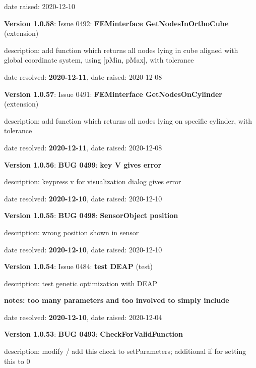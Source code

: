 date raised: 2020-12-10   \ei
  \item {\bf Version 1.0.58}: \vspace{-6pt} 
  Issue 0492: {\bf FEMinterface GetNodesInOrthoCube}
(extension)
  \bi
  \item {\small description: add function which returns all nodes lying in cube aligned with global coordinate system, using [pMin, pMax], with tolerance}
  \item   date resolved: {\bf 2020-12-11},
date raised: 2020-12-08   \ei
  \item {\bf Version 1.0.57}: \vspace{-6pt} 
  Issue 0491: {\bf FEMinterface GetNodesOnCylinder}
(extension)
  \bi
  \item {\small description: add function which returns all nodes lying on specific cylinder, with tolerance}
  \item   date resolved: {\bf 2020-12-11},
date raised: 2020-12-08   \ei
  \item {\bf Version 1.0.56}: \vspace{-6pt} 
{\bf \color{warningRed}  BUG 0499}: {\bf key V gives error}
  \bi
  \item {\small description: keypress v for visualization dialog gives error}
  \item   date resolved: {\bf 2020-12-10},
date raised: 2020-12-10   \ei
  \item {\bf Version 1.0.55}: \vspace{-6pt} 
{\bf \color{warningRed}  BUG 0498}: {\bf SensorObject position}
  \bi
  \item {\small description: wrong position shown in sensor}
  \item   date resolved: {\bf 2020-12-10},
date raised: 2020-12-10   \ei
  \item {\bf Version 1.0.54}: \vspace{-6pt} 
  Issue 0484: {\bf test DEAP}
(test)
  \bi
  \item {\small description: test genetic optimization with DEAP}
  \item {\small \bf notes: too many parameters and too involved to simply include}
  \item   date resolved: {\bf 2020-12-10},
date raised: 2020-12-04   \ei
  \item {\bf Version 1.0.53}: \vspace{-6pt} 
{\bf \color{warningRed}  BUG 0493}: {\bf CheckForValidFunction}
  \bi
  \item {\small description: modify / add this check to setParameters; additional if for setting this to 0}
